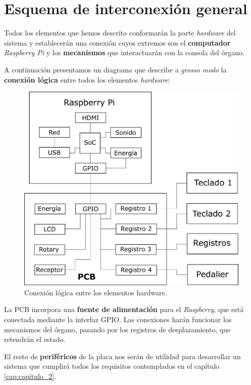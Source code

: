 \section{Esquema de interconexión general}

Todos los elementos que hemos descrito conformarán la parte \textit{hardware} del sistema y establecerán una conexión cuyos extremos son el \textbf{computador} \textit{Raspberry Pi} y los \textbf{mecanismos} que interactuarán con la consola del órgano.

A continuación presentamos un diagrama que describe a \textit{grosso modo} la \textbf{conexión lógica} entre todos los elementos \textit{hardware}:

\smallskip

\begin{figure}[H]
	\noindent \begin{centering}
		\includegraphics[width=\linewidth*2/3]{capitulo3/hardware}
		\par\end{centering}
	\smallskip
	\caption{\label{fig:hardware} Conexión lógica entre los elementos hardware.}
\end{figure} 

\smallskip

La \acrshort{PCB} incorpora una \textbf{fuente de alimentación} para el \textit{Raspberry}, que está conectada mediante la interfaz \acrshort{GPIO}. Las conexiones harán funcionar los mecanismos del órgano, pasando por los registros de desplazamiento, que retendrán el estado.

El resto de \textbf{periféricos} de la placa nos serán de utilidad para desarrollar un sistema que cumplirá todos los requisitos contemplados en el capítulo \ref{cap:capitulo_2}.

\clearpage{\cleardoublepage}
\clearpage{\pagestyle{empty}\cleardoublepage}